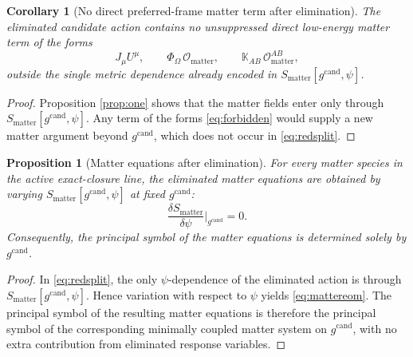 \documentclass[11pt]{article}
\newcommand{\CandidateMetric}{g^{\mathrm{cand}}}
\newcommand{\AuxPol}{\mathbb K}
\newcommand{\FlowPot}{\Phi_\Omega}
\newcommand{\MatterAct}{S_{\mathrm{matter}}}
\newtheorem{proposition}{Proposition}
\newtheorem{corollary}{Corollary}
\begin{document}
\begin{corollary}[No direct preferred-frame matter term after elimination]
\label{cor:nopf}
The eliminated candidate action contains no unsuppressed direct low-energy matter term of the forms
\begin{equation}
J_\mu U^\mu,
\qquad
\FlowPot\,\mathcal O_{\mathrm{matter}},
\qquad
\AuxPol_{AB}\,\mathcal O^{AB}_{\mathrm{matter}},
\label{eq:forbidden}
\end{equation}
outside the single metric dependence already encoded in \(\MatterAct[\CandidateMetric,\psi]\).
\end{corollary}

\begin{proof}
Proposition \ref{prop:one} shows that the matter fields enter only through \(\MatterAct[\CandidateMetric,\psi]\). Any term of the forms \eqref{eq:forbidden} would supply a new matter argument beyond \(\CandidateMetric\), which does not occur in \eqref{eq:redsplit}.
\end{proof}

\begin{proposition}[Matter equations after elimination]
\label{prop:mattereq}
For every matter species in the active exact-closure line, the eliminated matter equations are obtained by varying \(\MatterAct[\CandidateMetric,\psi]\) at fixed \(\CandidateMetric\):
\begin{equation}
\frac{\delta \MatterAct}{\delta\psi}
\biggr|_{\CandidateMetric}
=
0.
\label{eq:mattereom}
\end{equation}
Consequently, the principal symbol of the matter equations is determined solely by \(\CandidateMetric\).
\end{proposition}

\begin{proof}
In \eqref{eq:redsplit}, the only \(\psi\)-dependence of the eliminated action is through \(\MatterAct[\CandidateMetric,\psi]\). Hence variation with respect to \(\psi\) yields \eqref{eq:mattereom}. The principal symbol of the resulting matter equations is therefore the principal symbol of the corresponding minimally coupled matter system on \(\CandidateMetric\), with no extra contribution from eliminated response variables.
\end{proof}
\end{document}
